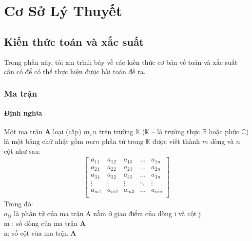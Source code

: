 
\everymath{\displaystyle}  

\chapter{Cơ Sở Lý Thuyết}
\label{chap:chap3}
\section{Kiến thức toán và xắc suất}
\hspace{5mm} Trong phần này, tôi xin trình bày về các kiến thức cơ bản về toán và xắc suất cần có để có thể thực hiện được bài toán đề ra.
\subsection{Ma trận}
\subsubsection{Định nghĩa}
\hspace{5mm} Một ma trận \textbf{A} loại (cấp) $m_x n$ trên trường $\mathbb{K}$ ($\mathbb{K}$ – là trường thực $\mathbb{R}$ hoặc phức $\mathbb{C}$) là một bảng chữ nhật gồm $m x n$ phần tử trong $\mathbb{K}$ được viết thành $m$ dòng và $n$ cột như sau:
\begin{align*}
	\begin{bmatrix}
		a_1{}_1 & a_1{}_2 & a_1{}_3  &\ldots& a_1{}_n \\
		a_2{}_1 & a_2{}_2 & a_2{}_3  & \ldots & a_2{}_n \\
		a_3{}_1 & a_3{}_2 & a_3{}_3  & \ldots & a_3{}_n \\
		\vdots & \vdots& \vdots  & \ddots& \vdots\\			
		a_m{}_1 & a_m{}_2 & a_m{}_3 &\ldots& a_m{}_n \\
	\end{bmatrix}	
\end{align*}
Trong đó: \\ 

	\hspace{5mm} $a_{ij}$ là phần tử của ma trận A nằm ở giao điểm của dòng i và cột j\\
	
	\hspace{5mm} m : số dòng của ma trận \textbf{A}\\
	
	\hspace{5mm} n: số cột của ma trận \textbf{A}\\
	

